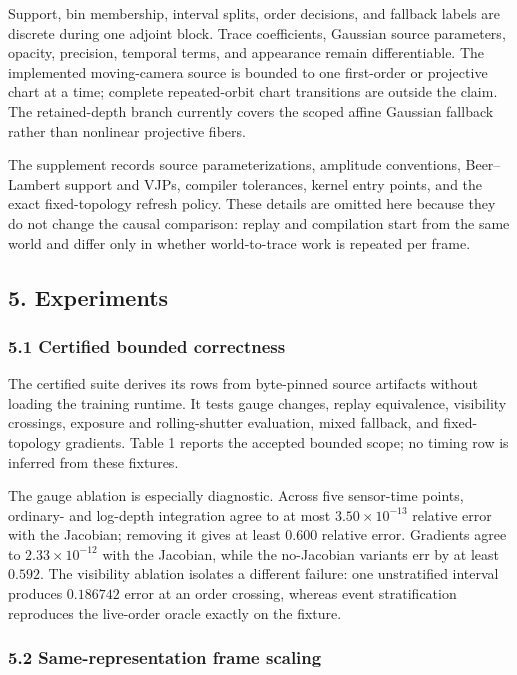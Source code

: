 \documentclass[
]{article}
\begin{document}
Support, bin membership, interval splits, order decisions, and fallback
labels are discrete during one adjoint block. Trace coefficients,
Gaussian source parameters, opacity, precision, temporal terms, and
appearance remain differentiable. The implemented moving-camera source
is bounded to one first-order or projective chart at a time; complete
repeated-orbit chart transitions are outside the claim. The
retained-depth branch currently covers the scoped affine Gaussian
fallback rather than nonlinear projective fibers.

The supplement records source parameterizations, amplitude conventions,
Beer--Lambert support and VJPs, compiler tolerances, kernel entry
points, and the exact fixed-topology refresh policy. These details are
omitted here because they do not change the causal comparison: replay
and compilation start from the same world and differ only in whether
world-to-trace work is repeated per frame.

\subsection{5. Experiments}\label{experiments}

\subsubsection{5.1 Certified bounded
correctness}\label{certified-bounded-correctness}

The certified suite derives its rows from byte-pinned source artifacts
without loading the training runtime. It tests gauge changes, replay
equivalence, visibility crossings, exposure and rolling-shutter
evaluation, mixed fallback, and fixed-topology gradients. Table 1
reports the accepted bounded scope; no timing row is inferred from these
fixtures.

The gauge ablation is especially diagnostic. Across five sensor-time
points, ordinary- and log-depth integration agree to at most
\(3.50\times10^{-13}\) relative error with the Jacobian; removing it
gives at least \(0.600\) relative error. Gradients agree to
\(2.33\times10^{-12}\) with the Jacobian, while the no-Jacobian variants
err by at least \(0.592\). The visibility ablation isolates a different
failure: one unstratified interval produces \(0.186742\) error at an
order crossing, whereas event stratification reproduces the live-order
oracle exactly on the fixture.

\subsubsection{5.2 Same-representation frame
scaling}\label{same-representation-frame-scaling}
\end{document}
